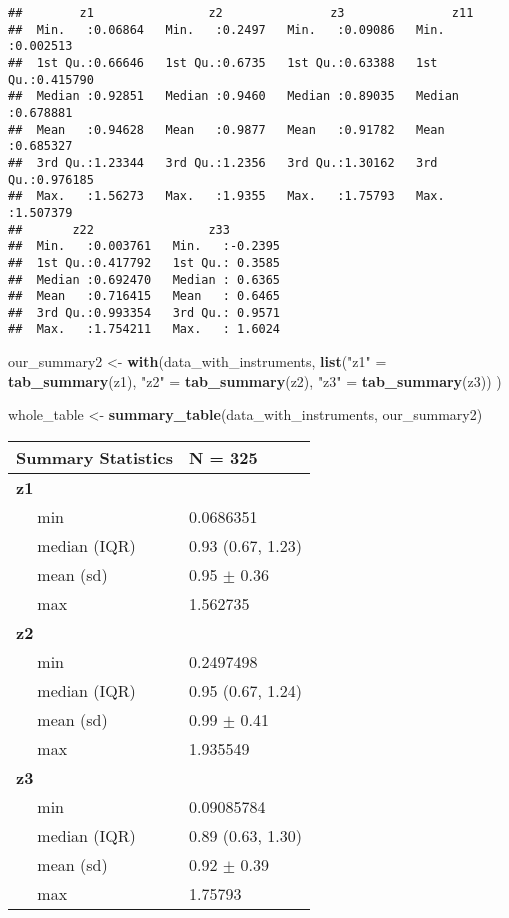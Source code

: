 \documentclass[]{article}
\newenvironment{Shaded}{\begin{snugshade}}{\end{snugshade}}
\newcommand{\KeywordTok}[1]{\textcolor[rgb]{0.13,0.29,0.53}{\textbf{#1}}}
\newcommand{\NormalTok}[1]{#1}
\newcommand{\StringTok}[1]{\textcolor[rgb]{0.31,0.60,0.02}{#1}}
\begin{document}
\begin{verbatim}
##        z1                z2               z3               z11          
##  Min.   :0.06864   Min.   :0.2497   Min.   :0.09086   Min.   :0.002513  
##  1st Qu.:0.66646   1st Qu.:0.6735   1st Qu.:0.63388   1st Qu.:0.415790  
##  Median :0.92851   Median :0.9460   Median :0.89035   Median :0.678881  
##  Mean   :0.94628   Mean   :0.9877   Mean   :0.91782   Mean   :0.685327  
##  3rd Qu.:1.23344   3rd Qu.:1.2356   3rd Qu.:1.30162   3rd Qu.:0.976185  
##  Max.   :1.56273   Max.   :1.9355   Max.   :1.75793   Max.   :1.507379  
##       z22                z33         
##  Min.   :0.003761   Min.   :-0.2395  
##  1st Qu.:0.417792   1st Qu.: 0.3585  
##  Median :0.692470   Median : 0.6365  
##  Mean   :0.716415   Mean   : 0.6465  
##  3rd Qu.:0.993354   3rd Qu.: 0.9571  
##  Max.   :1.754211   Max.   : 1.6024
\end{verbatim}

\begin{Shaded}
\begin{Highlighting}[]
\NormalTok{our_summary2 <-}\StringTok{ }
\StringTok{  }\KeywordTok{with}\NormalTok{(data_with_instruments,}
       \KeywordTok{list}\NormalTok{(}\StringTok{"z1"}\NormalTok{ =}\StringTok{ }\KeywordTok{tab_summary}\NormalTok{(z1),}
            \StringTok{"z2"}\NormalTok{ =}\StringTok{ }\KeywordTok{tab_summary}\NormalTok{(z2),}
            \StringTok{"z3"}\NormalTok{ =}\StringTok{ }\KeywordTok{tab_summary}\NormalTok{(z3))}
\NormalTok{  )}
  

\NormalTok{whole_table <-}\StringTok{ }\KeywordTok{summary_table}\NormalTok{(data_with_instruments, our_summary2)}
\end{Highlighting}
\end{Shaded}

\begin{tabular}{l|l}
\hline
Summary Statistics & N = 325\\
\hline
\bf{z1} & ~\\
\hline
~~ min & 0.0686351\\
\hline
~~ median (IQR) & 0.93 (0.67, 1.23)\\
\hline
~~ mean (sd) & 0.95 $\pm$ 0.36\\
\hline
~~ max & 1.562735\\
\hline
\bf{z2} & ~\\
\hline
~~ min & 0.2497498\\
\hline
~~ median (IQR) & 0.95 (0.67, 1.24)\\
\hline
~~ mean (sd) & 0.99 $\pm$ 0.41\\
\hline
~~ max & 1.935549\\
\hline
\bf{z3} & ~\\
\hline
~~ min & 0.09085784\\
\hline
~~ median (IQR) & 0.89 (0.63, 1.30)\\
\hline
~~ mean (sd) & 0.92 $\pm$ 0.39\\
\hline
~~ max & 1.75793\\
\hline
\end{tabular}
\end{document}
